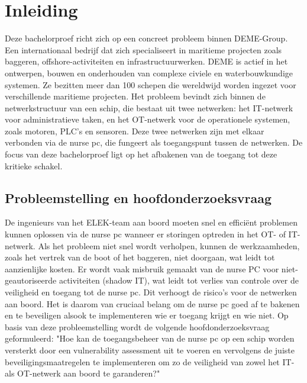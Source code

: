 


% 

\section{Inleiding}%
\label{sec:inleiding}
Deze bachelorproef richt zich op een concreet probleem binnen DEME-Group. Een internationaal bedrijf dat zich specialiseert in maritieme projecten zoals baggeren, offshore-activiteiten en infrastructuurwerken. 
DEME is actief in het ontwerpen, bouwen en onderhouden van complexe civiele en waterbouwkundige systemen. Ze bezitten meer dan 100 schepen die wereldwijd worden ingezet voor verschillende maritieme projecten.
Het probleem bevindt zich binnen de netwerkstructuur van een schip, die bestaat uit twee netwerken: 
het IT-netwerk voor administratieve taken, en het OT-netwerk voor de operationele systemen, zoals motoren, PLC's en sensoren. Deze twee netwerken zijn met elkaar verbonden via de nurse pc, die fungeert 
als toegangspunt tussen de netwerken. De focus van deze bachelorproef ligt op het afbakenen van de toegang tot deze kritieke schakel.

\subsection{Probleemstelling en hoofdonderzoeksvraag}
De ingenieurs van het ELEK-team aan boord moeten snel en efficiënt problemen kunnen oplossen via de nurse pc wanneer er storingen optreden in het OT- of IT-netwerk.
Als het probleem niet snel wordt verholpen, kunnen de werkzaamheden, zoals het vertrek van de boot of het baggeren, niet doorgaan, wat leidt tot aanzienlijke kosten. 
Er wordt vaak misbruik gemaakt van de nurse PC voor niet-geautoriseerde activiteiten (shadow IT), wat leidt tot verlies van controle over de veiligheid en toegang tot de nurse pc. 
Dit verhoogt de risico’s voor de netwerken aan boord. Het is daarom van cruciaal belang om de nurse pc goed af te bakenen en te beveiligen alsook te implementeren wie er toegang krijgt en wie niet.
Op basis van deze probleemstelling wordt de volgende hoofdonderzoeksvraag geformuleerd:
"Hoe kan de toegangsbeheer van de nurse pc op een schip worden versterkt door een vulnerability assessment 
uit te voeren en vervolgens de juiste beveiligingsmaatregelen te implementeren om zo de veiligheid van zowel het IT- als OT-netwerk aan boord te garanderen?"

